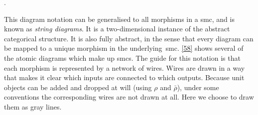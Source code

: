 \documentclass[nolinenum]{jfp}
\begin{document}
{}.

This diagram notation can be generalised to
all morphisms in a {\sc{}smc}, and is known as \emph{string diagrams}. It is a
two-dimensional instance of the abstract categorical structure.  It is
also fully abstract, in the sense that every diagram can be mapped to
a unique morphism in the underlying {\sc{}smc}. \cref{58} shows several of the
atomic diagrams which make up {\sc{}smc}s.  The guide for this notation is
that each morphism is represented by a network of wires. Wires are
drawn in a way that makes it clear which inputs are connected to which
outputs. Because unit objects can be
added and dropped at will (using \(ρ\) and \(\bar{ρ}\)),
under some conventions the corresponding wires are not drawn at
all. Here we choose to draw them as gray lines.
\end{document}

